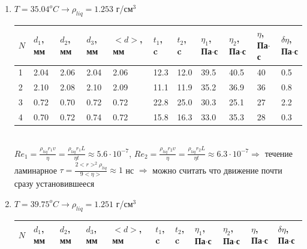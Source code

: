 \documentclass[12 pt, a4paper]{article}%
\begin{document}
\begin{enumerate}
\begin{table}[h!]
\begin{center}
\begin{tabular}{|*{11}{l|}}
     \hline
    \end{tabular}
   \end{center}
  \end{table} \\
  $Re_1 = \frac{\rho_{liq} r_1 v}{\eta} = \frac{\rho_{liq} r_1 L}{\eta t} \approx 2.3\cdot10^{-7} $,
  $Re_2 = \frac{\rho_{liq} r_2 v}{\eta} = \frac{\rho_{liq} r_2 L}{\eta t} \approx 5\cdot10^{-7} \Rightarrow$ течение ламинарное
  $\tau = \frac{2 <r>^2 \rho_{liq}}{9 <\eta>} \approx 2$ нс $\Rightarrow$ можно считать что движение почти сразу установившееся
  \item $T = 35.04 ^oC \rightarrow \rho_{liq} = 1.253$ г/см$^3$
    \begin{table}[h!] 
   \begin{center}
    \begin{tabular}{|*{11}{l|}} \hline
     $N$ & $d_1$, мм  & $d_2$, мм & $d_3$, мм & $<d>$, мм & $t_1$, c & $t_2$, c & $\eta_1$, Па$\cdot$с & $\eta_2$, Па$\cdot$с & $\eta$, Па$\cdot$с & $\delta\eta$, Па$\cdot$с \\ \hline
     1 & 2.04 & 2.06 & 2.04 & 2.06 & 12.3 & 12.0 & 39.5 & 40.5 & 40 & 0.5 \\ \hline
     2 & 2.10 & 2.08 & 2.10 & 2.09 & 11.1 & 11.9 & 35.2 & 36.9 & 36 & 0.8\\ \hline
     3 & 0.72 & 0.70 & 0.72 & 0.72 & 22.8 & 25.0 & 30.3 & 25.1 & 27 & 2.2\\
     \hline
     4 & 0.70 & 0.72 & 0.74 & 0.72 & 15.8 & 16.3 & 33.0 & 35.3 & 28 & 0.3\\
     \hline
    \end{tabular}
   \end{center}
  \end{table} \\
  $Re_1 = \frac{\rho_{liq} r_1 v}{\eta} = \frac{\rho_{liq} r_1 L}{\eta t} \approx 5.6\cdot10^{-7} $,
  $Re_2 = \frac{\rho_{liq} r_2 v}{\eta} = \frac{\rho_{liq} r_2 L}{\eta t} \approx 6.3\cdot10^{-7} \Rightarrow$ течение ламинарное
  $\tau = \frac{2 <r>^2 \rho_{liq}}{9 <\eta>} \approx 1$ нс $\Rightarrow$ можно считать что движение почти сразу установившееся
  \item $T = 39.75 ^oC \rightarrow \rho_{liq} = 1.251$ г/см$^3$
    \begin{table}[h!] 
   \begin{center}
    \begin{tabular}{|*{11}{l|}} \hline
     $N$ & $d_1$, мм  & $d_2$, мм & $d_3$, мм & $<d>$, мм & $t_1$, c & $t_2$, c & $\eta_1$, Па$\cdot$с & $\eta_2$, Па$\cdot$с & $\eta$, Па$\cdot$с & $\delta\eta$, Па$\cdot$с \\ \hline

\end{tabular}
\end{center}
\end{table}
\end{enumerate}
\end{document}
